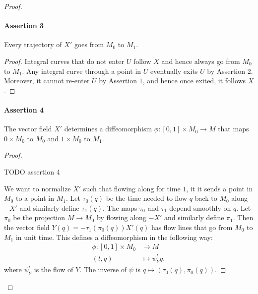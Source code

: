 \begin{proof}
\paragraph{Assertion 3}
Every trajectory of $X'$ goes from $M_0$ to $M_1$.
\begin{proof}
    Integral curves that do not enter $U$ follow $X$ and hence always go from  $M_0$ to $M_1$.
    Any integral curve through a point in $U$ eventually exits $U$ by Assertion 2. Moreover, it cannot re-enter $U$ by Assertion $1$, and hence once exited, it follows $X$.
\end{proof}

\paragraph{Assertion 4}
The vector field $X'$ determines a diffeomorphism $\phi: [0, 1] \times M_0 \to M$ that maps $0 \times M_0$ to $M_0$ and $1 \times M_0$ to $ M_1$.
\begin{proof}
    \begin{marginfigure}
        \centering
        \caption{TODO assertion 4}
        \label{fig:assertion-4}
    \end{marginfigure}
    We want to normalize $X'$ such that flowing along for time $1$, it it sends a point in  $M_0$ to a point in $M_1$.
    Let $\tau_0(q)$ be the time needed to flow $q$ back to $M_0$ along $-X'$ and similarly define $\tau_1(q)$. The maps $\tau_0$ and $\tau_1$ depend smoothly on $q$.
    Let $\pi_0$ be the projection  $M \to M_0$ by flowing along $-X'$ and similarly define $\pi_1$.
    Then the vector field $Y(q) = -\tau_1(\pi_0(q)) X'(q)$ has flow lines that go from $ M_0$ to $M_1$ in unit time.
    This defines a diffeomorphism in the following way:
    \begin{align*}
        \phi: [0, 1] \times M_0 &\longrightarrow M \\
        (t, q) &\longmapsto \psi^{t}_Y q
    ,\end{align*}
    where $\psi^{t}_Y$ is the flow of $Y$.
    The inverse of $\psi$ is $q \mapsto (\tau_0(q), \pi_0(q))$.
\end{proof}


\end{proof}
